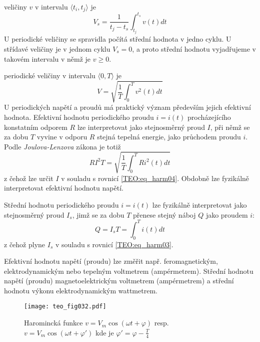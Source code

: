      veličiny $v$ v intervalu $\langle t_i, t_j\rangle$ je 
    \begin{equation}\label{TEO:eq_harm03}
      V_s = \frac{1}{t_j-t_s}\int_{t_j}^{t_s}v(t)dt
    \end{equation}
    U periodické veličiny se spravidla počítá střední hodnota v jedno cyklu. U střídavé veličiny je
    v jednom cyklu $V_s = 0$,  a proto střední hodnotu vyjadřujeme v takovém intervalu v němž je
    $v\geq0$.
    
     periodické veličiny v intervalu $\langle 0, T\rangle$ je 
    \begin{equation}\label{TEO:eq_harm04}
      V = \sqrt{\frac{1}{T}\int_{0}^{T}v^2(t)dt}
    \end{equation}   
    U periodických napětí a proudů má praktický význam především jejich efektivní hodnota.
    Efektivní hodnotu periodického proudu $i=i(t)$ procházejícího konstatním odporem $R$ lze
    interpretovat jako stejnosměrný proud $I$, při němž se za dobu $T$ vyvine v odporu $R$ stejná
    tepelná energie, jako průchodem proudu $i$. Podle \emph{Joulova-Lenzova} zákona je totiž
    \begin{equation}\label{TEO:eq_harm05}
      RI^2T = \sqrt{\frac{1}{T}\int_{0}^{T}Ri^2(t)dt}
    \end{equation}       
    z čehož lze určit $I$ v souladu s rovnicí \ref{TEO:eq_harm04}. Obdobně lze fyzikálně
    interpretovat efektivní hodnotu napětí.
    
    Střední hodnotu periodického proudu $i=i(t)$ lze fyzikálně interpretovat jako stejnosměrný
    proud $I_s$, jimž se za dobu $T$ přenese stejný náboj $Q$ jako proudem $i$:
    \begin{equation}\label{TEO:eq_harm06}
      Q = I_sT = \int_{0}^{T}i(t)dt
    \end{equation}       
    z čehož plyne $I_s$ v souladu s rovnicí \ref{TEO:eq_harm03}.  
    
    Efektivní hodnotu napětí (proudu) lze změřit např. feromagnetickým, elektrodynamickým nebo
    tepelným voltmetrem (ampérmetrem). Střední hodnotu napětí (proudu) magnetoelektrickým
    voltmetrem (ampérmetrem) a střední hodnotu výkonu elektrodynamickým wattmetrem.

    \begin{figure}[ht!] %
       \centering
       \texttt{[image: teo\_fig032.pdf]}
       \caption{Haromincká funkce $v = V_m\cos(\omega t + \varphi)$ resp. 
                $v= V_m\cos(\omega t + \varphi')$ kde je $\varphi' = \varphi - \frac{T}{4}$}
       \label{teo:fig032}
    \end{figure}

